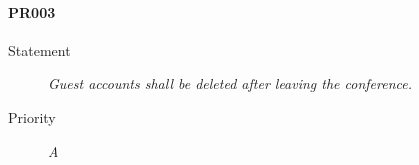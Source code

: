 \paragraph{PR003}
  \begin{description}
  \item [Statement] 
    \textit{ Guest accounts shall be deleted after leaving the conference.}
  \item [Priority] \textit{A}
\end{description}
